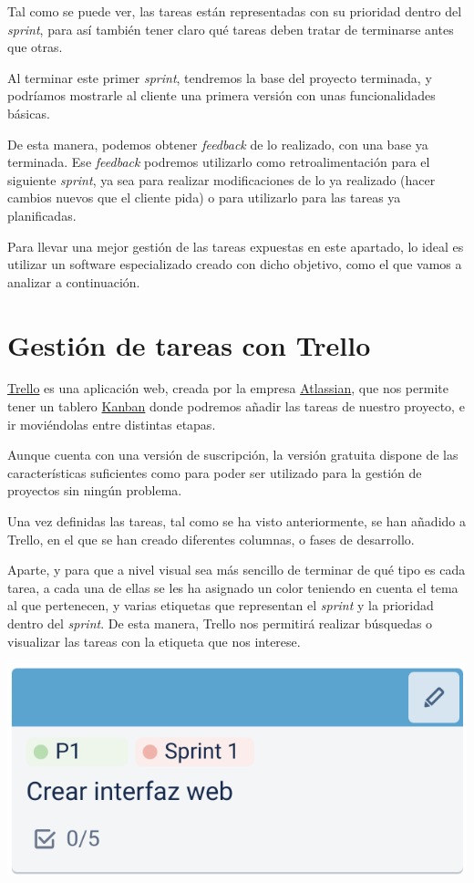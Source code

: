 \documentclass{\ClassPath/viu-tfm-template}
\begin{document}
Tal como se puede ver, las tareas están representadas con su prioridad dentro del \textit{sprint}, para así también tener claro qué tareas deben tratar de terminarse antes que otras.

Al terminar este primer \textit{sprint}, tendremos la base del proyecto terminada, y podríamos mostrarle al cliente una primera versión con unas funcionalidades básicas.

De esta manera, podemos obtener \textit{feedback} de lo realizado, con una base ya terminada. Ese \textit{feedback} podremos utilizarlo como retroalimentación para el siguiente \textit{sprint}, ya sea para realizar modificaciones de lo ya realizado (hacer cambios nuevos que el cliente pida) o para utilizarlo para las tareas ya planificadas.

Para llevar una mejor gestión de las tareas expuestas en este apartado, lo ideal es utilizar un software especializado creado con dicho objetivo, como el que vamos a analizar a continuación.

\section{Gestión de tareas con Trello}

\href{https://trello.com/}{Trello} es una aplicación web, creada por la empresa \href{https://www.atlassian.com/}{Atlassian}, que nos permite tener un tablero \href{https://en.wikipedia.org/wiki/Kanban_(development)}{Kanban} donde podremos añadir las tareas de nuestro proyecto, e ir moviéndolas entre distintas etapas.

Aunque cuenta con una versión de suscripción, la versión gratuita dispone de las características suficientes como para poder ser utilizado para la gestión de proyectos sin ningún problema.

Una vez definidas las tareas, tal como se ha visto anteriormente, se han añadido a Trello, en el que se han creado diferentes columnas, o fases de desarrollo.

Aparte, y para que a nivel visual sea más sencillo de terminar de qué tipo es cada tarea, a cada una de ellas se les ha asignado un color teniendo en cuenta el tema al que pertenecen, y varias etiquetas que representan el \textit{sprint} y la prioridad dentro del \textit{sprint}. De esta manera, Trello nos permitirá realizar búsquedas o visualizar las tareas con la etiqueta que nos interese.


\begin{center}
    \includegraphics[width=0.5\linewidth]{img/tarea.png}
\end{center}
\end{document}
